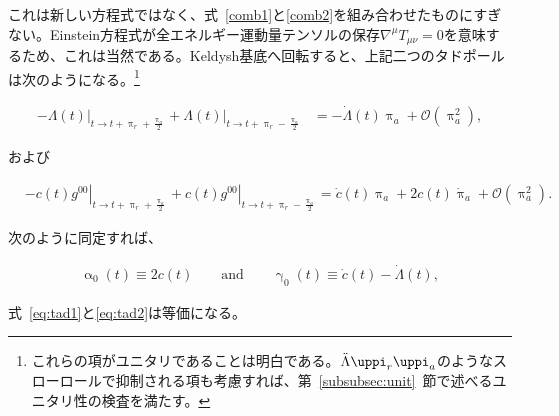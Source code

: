 \documentclass[a4paper,11pt]{ltjsarticle}
\numberwithin{equation}{section}
\newcommand{\Eqs}[1]{Eqs.~(\ref{#1})}
\newcommand{\Sec}[1]{Sec.~\ref{#1}}
\renewcommand{\Eqs}[1]{式~\eqref{#1}}
\renewcommand{\Sec}[1]{第~\ref{#1}~節}
\begin{document}
\begin{tcolorbox}[enhanced,breakable,skin first=enhanced,skin middle=enhanced,skin last=enhanced,before upper={\parindent15pt},]{}
これは新しい方程式ではなく、\Eqs{comb1}と\eqref{comb2}を組み合わせたものにすぎない。Einstein方程式が全エネルギー運動量テンソルの保存$\nabla^\mu T_{\mu\nu}=0$を意味するため、これは当然である。Keldysh基底へ回転すると、上記二つのタドポールは次のようになる。\footnote{これらの項がユニタリであることは明白である。$\Ddot{\Lambda}\uppi_r\uppi_a$のようなスローロールで抑制される項も考慮すれば、\Sec{subsubsec:unit}で述べるユニタリ性の検査を満たす。}

\begin{align}
              -\left.\Lambda(t)\right|_{t\rightarrow t + \uppi_r + \frac{\uppi_a}{2}} + \left.\Lambda(t)\right|_{t\rightarrow t + \uppi_r - \frac{\uppi_a}{2}}  &= - \dot{\Lambda}(t) \uppi_a + \mathcal{O}(\uppi_a^2),
        \end{align}

および

\begin{align}
            &-\left.c(t) g^{00}\right|_{t\rightarrow t + \uppi_r + \frac{\uppi_a}{2}} + \left.c(t) g^{00}\right|_{t\rightarrow t + \uppi_r - \frac{\uppi_a}{2}}    =  \dot{c}(t) \uppi_a + 2 c(t) \dot{\uppi}_a + \mathcal{O}(\uppi_a^2).
        \end{align}

次のように同定すれば、

\begin{align}\label{eq:tadpole}
            \upalpha_0(t) \equiv 2 c(t) \qquad \mathrm{and} \qquad \upgamma_0 (t)\equiv  \dot{c}(t) - \dot{\Lambda}(t),
        \end{align}

\Eqs{eq:tad1}と\eqref{eq:tad2}は等価になる。
\end{tcolorbox}
\end{document}
